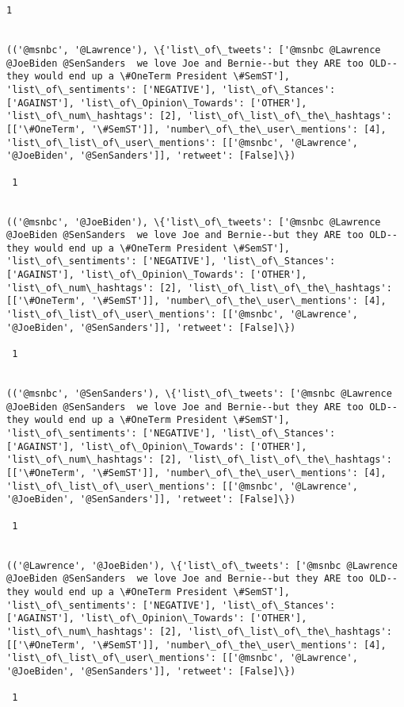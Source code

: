 \documentclass[11pt]{article}
\begin{document}
\begin{Verbatim}[commandchars=\\\{\}]
 1
 

(('@msnbc', '@Lawrence'), \{'list\_of\_tweets': ['@msnbc @Lawrence @JoeBiden @SenSanders  we love Joe and Bernie--but they ARE too OLD--they would end up a \#OneTerm President \#SemST'], 'list\_of\_sentiments': ['NEGATIVE'], 'list\_of\_Stances': ['AGAINST'], 'list\_of\_Opinion\_Towards': ['OTHER'], 'list\_of\_num\_hashtags': [2], 'list\_of\_list\_of\_the\_hashtags': [['\#OneTerm', '\#SemST']], 'number\_of\_the\_user\_mentions': [4], 'list\_of\_list\_of\_user\_mentions': [['@msnbc', '@Lawrence', '@JoeBiden', '@SenSanders']], 'retweet': [False]\})

 1
 

(('@msnbc', '@JoeBiden'), \{'list\_of\_tweets': ['@msnbc @Lawrence @JoeBiden @SenSanders  we love Joe and Bernie--but they ARE too OLD--they would end up a \#OneTerm President \#SemST'], 'list\_of\_sentiments': ['NEGATIVE'], 'list\_of\_Stances': ['AGAINST'], 'list\_of\_Opinion\_Towards': ['OTHER'], 'list\_of\_num\_hashtags': [2], 'list\_of\_list\_of\_the\_hashtags': [['\#OneTerm', '\#SemST']], 'number\_of\_the\_user\_mentions': [4], 'list\_of\_list\_of\_user\_mentions': [['@msnbc', '@Lawrence', '@JoeBiden', '@SenSanders']], 'retweet': [False]\})

 1
 

(('@msnbc', '@SenSanders'), \{'list\_of\_tweets': ['@msnbc @Lawrence @JoeBiden @SenSanders  we love Joe and Bernie--but they ARE too OLD--they would end up a \#OneTerm President \#SemST'], 'list\_of\_sentiments': ['NEGATIVE'], 'list\_of\_Stances': ['AGAINST'], 'list\_of\_Opinion\_Towards': ['OTHER'], 'list\_of\_num\_hashtags': [2], 'list\_of\_list\_of\_the\_hashtags': [['\#OneTerm', '\#SemST']], 'number\_of\_the\_user\_mentions': [4], 'list\_of\_list\_of\_user\_mentions': [['@msnbc', '@Lawrence', '@JoeBiden', '@SenSanders']], 'retweet': [False]\})

 1
 

(('@Lawrence', '@JoeBiden'), \{'list\_of\_tweets': ['@msnbc @Lawrence @JoeBiden @SenSanders  we love Joe and Bernie--but they ARE too OLD--they would end up a \#OneTerm President \#SemST'], 'list\_of\_sentiments': ['NEGATIVE'], 'list\_of\_Stances': ['AGAINST'], 'list\_of\_Opinion\_Towards': ['OTHER'], 'list\_of\_num\_hashtags': [2], 'list\_of\_list\_of\_the\_hashtags': [['\#OneTerm', '\#SemST']], 'number\_of\_the\_user\_mentions': [4], 'list\_of\_list\_of\_user\_mentions': [['@msnbc', '@Lawrence', '@JoeBiden', '@SenSanders']], 'retweet': [False]\})

 1
 


\end{Verbatim}
\end{document}
